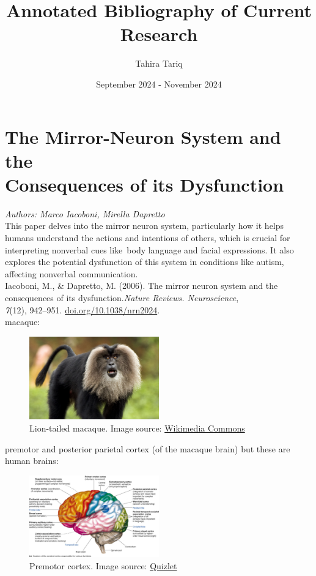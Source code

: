 \documentclass[12pt]{article}
\title{Annotated Bibliography of Current Research}
\author{Tahira Tariq}
\date{September 2024 - November 2024}
\begin{document}
\maketitle

\section{The Mirror-Neuron System and the\\Consequences of its Dysfunction}
\textit{Authors: Marco Iacoboni, Mirella Dapretto}\\
This paper delves into the mirror neuron system, particularly how it helps humans understand the actions and intentions of others, which is crucial for interpreting nonverbal cues like body language and facial expressions. It also explores the potential dysfunction of this system in conditions like autism, affecting nonverbal communication.\\

\noindent Iacoboni, M., \& Dapretto, M. (2006). The mirror neuron system and the\\consequences of its dysfunction.\textit{Nature Reviews. Neuroscience},\\\textit{7}(12), 942–951. \href{https://doi.org/10.1038/nrn2024}{doi.org/10.1038/nrn2024}.\\

\noindent macaque:\\
\begin{figure}[ht]
    \centering
    \includegraphics[width=0.5\textwidth]{macaque.jpg} %
    \caption{Lion-tailed macaque. Image source: \href{https://commons.wikimedia.org/wiki/File:Lion-tailed_macaque_by_N_A_Nazeer.jpg}{Wikimedia Commons}}
    \label{fig:macaque}
\end{figure}

\noindent premotor and posterior parietal cortex (of the macaque brain) but these are human brains:\\
\begin{figure}[ht]
    \centering
    \includegraphics[width=0.5\textwidth]{brain1.png} %
    \caption{Premotor cortex. Image source: \href{https://o.quizlet.com/il-zAgEMk31L--6ugy5MGw_b.png}{Quizlet}}
    \label{fig:pre}
\end{figure}
\end{document}

